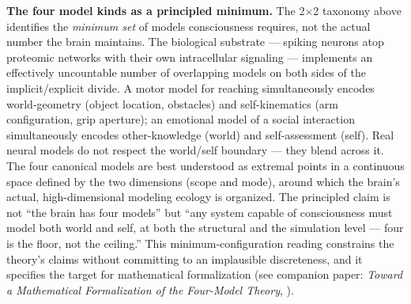 \documentclass[12pt]{article}
\begin{document}
\textbf{The four model kinds as a principled minimum.} The 2$\times$2 taxonomy above identifies the \emph{minimum set} of models consciousness requires, not the actual number the brain maintains. The biological substrate --- spiking neurons atop proteomic networks with their own intracellular signaling --- implements an effectively uncountable number of overlapping models on both sides of the implicit/explicit divide. A motor model for reaching simultaneously encodes world-geometry (object location, obstacles) and self-kinematics (arm configuration, grip aperture); an emotional model of a social interaction simultaneously encodes other-knowledge (world) and self-assessment (self). Real neural models do not respect the world/self boundary --- they blend across it. The four canonical models are best understood as extremal points in a continuous space defined by the two dimensions (scope and mode), around which the brain's actual, high-dimensional modeling ecology is organized. The principled claim is not ``the brain has four models'' but ``any system capable of consciousness must model both world and self, at both the structural and the simulation level --- four is the floor, not the ceiling.'' This minimum-configuration reading constrains the theory's claims without committing to an implausible discreteness, and it specifies the target for mathematical formalization (see companion paper: \emph{Toward a Mathematical Formalization of the Four-Model Theory}, \citealp{Gruber2026b}).
\end{document}
